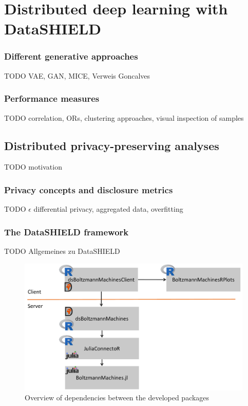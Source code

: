 \documentclass[12pt]{article}
\begin{document}
\FloatBarrier
\section{Distributed deep learning with DataSHIELD}

\subsubsection{Different generative approaches}
TODO VAE, GAN, MICE, Verweis Goncalves

\subsubsection{Performance measures}
TODO correlation, ORs, clustering approaches, visual inspection of samples


\subsection{Distributed privacy-preserving analyses}
TODO motivation

\subsubsection{Privacy concepts and disclosure metrics}
TODO $\epsilon$ differential privacy, aggregated data, overfitting

\subsubsection{The DataSHIELD framework}
TODO Allgemeines zu DataSHIELD



\begin{figure}[h]
   \centering
   \includegraphics[scale=0.5]{images/dsBoltzmannMachinesOverview.pdf}
   \caption{Overview of dependencies between the developed packages}
 \end{figure}
 
\end{document}
